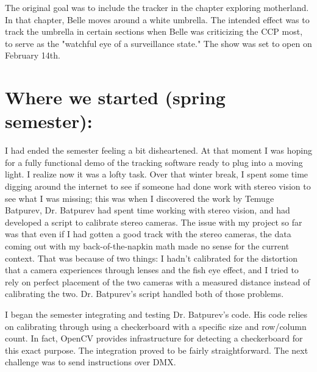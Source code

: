 \documentclass[
    12pt,
    twoside,
    bibstyle=chicago,
    headerstyle=uppercase,
	bibfile=biblatex_updating.bib
]{reedthesis}
\begin{document}
The original goal was to include the tracker in the chapter exploring motherland. In that chapter, Belle moves around a white umbrella. The intended effect was to track the umbrella in certain sections when Belle was criticizing the CCP most, to serve as the "watchful eye of a surveillance state." The show was set to open on February 14th.

\section{Where we started (spring semester):}

I had ended the semester feeling a bit disheartened. At that moment I was hoping for a fully functional demo of the tracking software ready to plug into a moving light. I realize now it was a lofty task. Over that winter break, I spent some time digging around the internet to see if someone had done work with stereo vision to see what I was missing; this was when I discovered the work by Temuge Batpurev, Dr. Batpurev had spent time working with stereo vision, and had developed a script to calibrate stereo cameras. The issue with my project so far was that even if I had gotten a good track with the stereo cameras, the data coming out with my back-of-the-napkin math made no sense for the current context. That was because of two things: I hadn't calibrated for the distortion that a camera experiences through lenses and the fish eye effect, and I tried to rely on perfect placement of the two cameras with a measured distance instead of calibrating the two. Dr. Batpurev's script handled both of those problems.

I began the semester integrating and testing Dr. Batpurev's code. His code relies on calibrating through using a checkerboard with a specific size and row/column count. In fact, OpenCV provides infrastructure for detecting a checkerboard for this exact purpose. The integration proved to be fairly straightforward. The next challenge was to send instructions over DMX.
\end{document}
